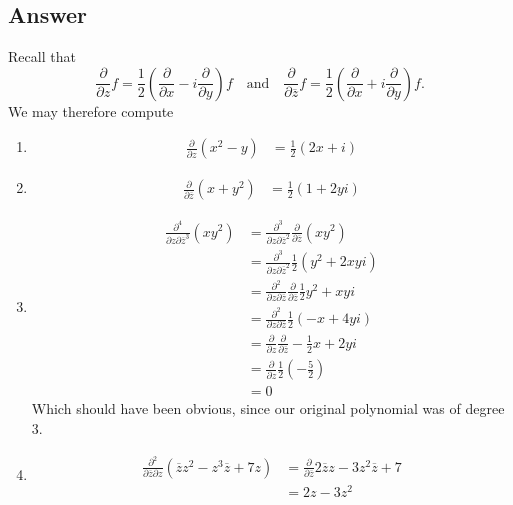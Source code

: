 \documentclass[11pt]{article}
\begin{document}
\subsection{Answer}
Recall that 
\[\frac{\partial}{\partial z} f = \frac{1}{2} \left( \frac{\partial}{\partial x }  - i \frac{\partial}{\partial y} \right) f \quad\mbox{and}\quad \frac{\partial}{\partial \overline{z}} f = \frac{1}{2} \left( \frac{\partial}{\partial x }  + i \frac{\partial}{\partial y} \right) f .\]
We may therefore compute
\begin{enumerate}
\item \begin{align*} \frac{\partial}{\partial z} (x^2 - y )& =  \frac{1}{2} \left( 2 x +i\right)  
\end{align*}
\item \begin{align*}  \frac{\partial}{\partial \overline{z}}(x + y^2)  &=  \frac{1}{2} \left( 1 + 2 y i  \right)
\end{align*}
\item \begin{align*}  
\frac{\partial^4}{\partial z \partial \overline{z}^3} (x y ^2) &= \frac{\partial^3}{\partial z \partial \overline{z}^2} \frac{\partial}{\partial \overline{z}} (x y ^2) \\
&= \frac{\partial^3}{\partial z \partial \overline{z}^2} \frac{1}{2} \left( y^2 + 2 xyi\right) \\
&= \frac{\partial^2}{\partial z \partial \overline{z}}  \frac{\partial}{\partial \overline{z}} \frac{1}{2} y^2 +  xyi \\
&= \frac{\partial^2}{\partial z \partial \overline{z}}  \frac{1}{2} \left( -x  + 4 y i\right) \\
&= \frac{\partial}{\partial z }  \frac{\partial }{\partial \overline{z}}- \frac{1}{2} x  + 2 y i \\
&= \frac{\partial}{\partial z }  \frac{1}{2} \left( -\frac{5}{2} \right) \\
&=0
\end{align*}
Which should have been obvious, since our original polynomial was of degree 3.
\item \begin{align*}\frac{\partial^2}{\partial \overline{z} \partial z}  ( \overline{z} z^2 - z^3 \overline{z} + 7 z ) &= \frac{\partial}{\partial \overline{z}}  2 \overline{z}  z - 3 z^2 \overline{z} + 7\\
&= 2 z - 3 z^2
\end{align*} 
\end{enumerate}
\end{document}
